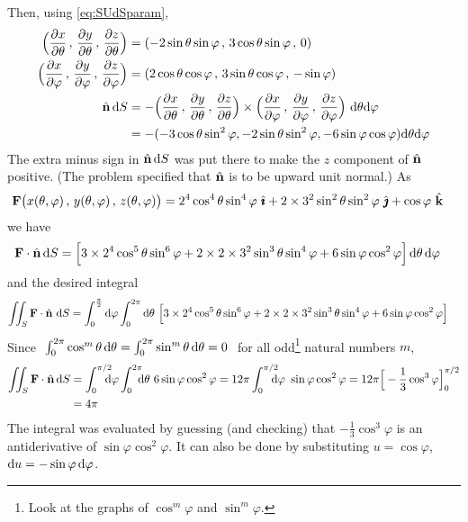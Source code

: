 \begin{eg}
Then, using \eqref{eq:SUdSparam}, 
\begin{align*}
\Big(\frac{\partial x}{\partial\theta}\,,\,\frac{\partial y}{\partial\theta}
             \,,\, \frac{\partial z}{\partial\theta}\Big)
&=(-2\sin\theta\sin\varphi\,,\,3\cos\theta\sin\varphi\,,\,0) \\
%
\Big(\frac{\partial x}{\partial\varphi}\,,\,\frac{\partial y}{\partial\varphi}\,,\,
                     \frac{\partial z}{\partial\varphi}\Big)
&=(2\cos\theta\cos\varphi\,,\,3\sin\theta\cos\varphi\,,\,-\sin\varphi)\\
%
\hn\,\dee{S}&=
-\Big(\frac{\partial x}{\partial\theta}\,,\,\frac{\partial y}{\partial\theta}
   \,,\, \frac{\partial z}{\partial\theta}\Big)
\times\Big(\frac{\partial x}{\partial\varphi}\,,\,\frac{\partial y}{\partial\varphi}
   \,,\,\frac{\partial z}{\partial\varphi}\Big)\ \dee{\theta} \dee{\varphi}\\
&=-(-3\cos\theta\sin^2\varphi,-2\sin\theta\sin^2\varphi,-6\sin\varphi\cos\varphi)\dee{\theta} \dee{\varphi}
\end{align*}
The extra minus sign in $\hat{\mathbf{n}}\,\mathrm{d}S$ was put there to make the $z$
component of $\hat{\mathbf{n}}$ positive. (The problem specified that 
$\hat{\mathbf{n}}$ is to be upward unit normal.) 
As
\begin{align*}
\mathbf{F}\big(x(\theta,\varphi)\,,\,y(\theta,\varphi)\,,\,z(\theta,\varphi)\big)
&=2^4\cos^4\theta\sin^4\varphi\ \hat{\pmb{\imath}}
  +2\times 3^2\sin^2\theta\sin^2\varphi\ \hat{\pmb{\jmath}}+\cos\varphi\ \hat{\mathbf{k}}
\end{align*}
we have 
\begin{align*}
\mathbf{F}\cdot\hat{\mathbf{n}}\,\mathrm{d}S
&=\Big[3\times 2^4\cos^5\theta\sin^6\varphi+2\times 2 \times 3^2
\sin^3\theta\sin^4\varphi+6\sin\varphi\cos^2\varphi\Big]\,\mathrm{d}\theta\,\mathrm{d}\varphi
\end{align*}
and the desired integral
\begin{align*}
 \dblInt_S\vF\cdot\hn\ \dee{S}
&=\int_0^{\frac{\pi}{2}}\dee{\varphi}\int_0^{2\pi}\dee{\theta}\ 
\Big[3\times 2^4\cos^5\theta\sin^6\varphi+2\times 2\times 3^2
\sin^3\theta\sin^4\varphi+6\sin\varphi\cos^2\varphi\Big]
\end{align*}
Since 
$\ \int_0^{2\pi} \cos^m\theta\,\mathrm{d}\theta
=\int_0^{2\pi} \sin^m\theta\,\mathrm{d}\theta=0\ $ for all
odd\footnote{Look at the graphs of $\cos^m\varphi$ and 
$\sin^m\varphi$.} natural numbers $m$, 
\begin{align*}
\dblInt_S \vF\cdot\hn\, \dee{S}
&=\int_0^{\pi/2}\hskip-8pt \dee{\varphi}\int_0^{2\pi}\hskip-6pt\dee{\theta}\ 
                  6\sin\varphi\cos^2\varphi
=12\pi\int_0^{\pi/2}\hskip-8pt \dee{\varphi}\ \sin\varphi\cos^2\varphi
=12\pi\Big[-\frac{1}{3}\cos^3\varphi\Big]_0^{\pi/2}\\
&=4\pi
\end{align*}
The integral was evaluated by guessing (and checking) that 
$-\frac{1}{3}\cos^3\varphi$ is an antiderivative of $\sin\varphi\cos^2\varphi$.
It can also be done by substituting $u=\cos\varphi$, 
$\mathrm{d}u=-\sin\varphi\,\mathrm{d}\varphi$.


\end{eg}
